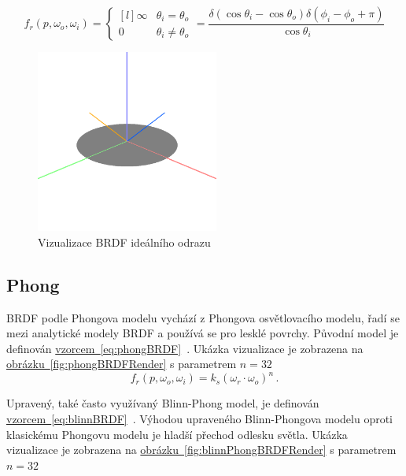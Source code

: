 \documentclass[czech,master]{diploma}
\newcommand{\point}{p}
\newcommand{\brdf}{f_r\left(\point,\omega_{o},\omega_{i}\right)}
\newcommand{\outVec}{\omega_{o}}
\newcommand{\refl}{\omega_{r}}
\begin{document}
\begin{equation} \label{eq:idealReflectionBRDF}
  \brdf  =  \left\{\begin{matrix*}[l] \infty & \theta_i = \theta_o \\ 0 & \theta_i \neq \theta_o \end{matrix*}\right. = \frac{\delta\left(\cos\theta_i-\cos\theta_o\right)\delta\left(\phi_i-\phi_o+\pi\right)}{\cos\theta_i}
\end{equation}


\begin{figure}[ht]%
  \centering
  \includegraphics[width=6cm]{Figures/visualizations/brdfMirror.png}
  \caption{Vizualizace BRDF ideálního odrazu}%
  \label{fig:idealReflectionBRDFViz}%
\end{figure}


\subsection{Phong} \label{sec:Phong}
BRDF podle Phongova modelu vychází z Phongova osvětlovacího modelu, řadí se mezi analytické modely BRDF a používá se pro lesklé povrchy. Původní model je definován \hyperref[eq:phongBRDF]{vzorcem~\ref{eq:phongBRDF}}~\cite{Phong1975}. Ukázka vizualizace je zobrazena na \hyperref[fig:phongBRDFRender]{obrázku~\ref{fig:phongBRDFRender}} s parametrem \(n = 32\)
\begin{equation} \label{eq:phongBRDF}
  \brdf = k_s{(\refl\cdot\outVec)}^{n}\,.
\end{equation}

Upravený, také často využívaný Blinn-Phong model, je definován \hyperref[eq:blinnBRDF]{vzorcem~\ref{eq:blinnBRDF}}~\cite{BlinnPhong1977}. Výhodou upraveného Blinn-Phongova modelu oproti klasickému Phongovu modelu je hladší přechod odlesku světla. Ukázka vizualizace je zobrazena na \hyperref[fig:blinnPhongBRDFRender]{obrázku~\ref{fig:blinnPhongBRDFRender}} s parametrem \(n = 32\)
\end{document}
